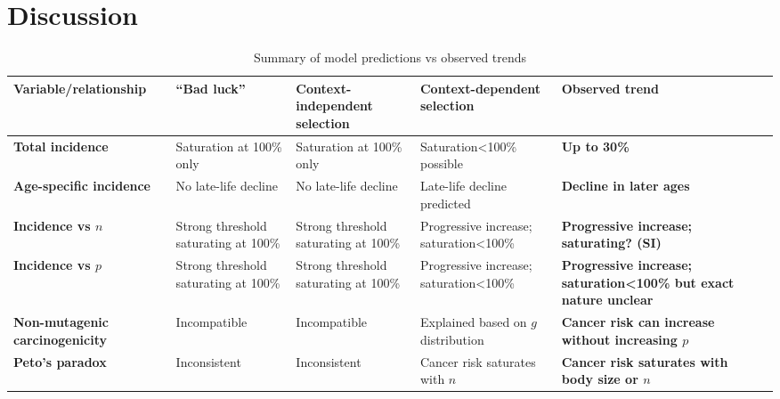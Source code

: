 \documentclass[9pt,twocolumn,twoside]{pnas-new}
\begin{document}
\section*{Discussion}
%
\begin{table}[tbhp]
\centering
\caption{Summary of model predictions vs observed trends}
\begin{tabular}{lp{2.5cm}p{3.5cm}p{3.5cm}p{3.5cm}p{4.5cm}}
\textbf{Variable/relationship} & ``Bad luck'' & Context-independent selection & Context-dependent selection & \textbf{Observed trend}\\
\midrule
\textbf{Total incidence} & Saturation at 100\% only & Saturation at 100\% only & Saturation<100\% possible & \textbf{Up to 30\%}\\
\textbf{Age-specific incidence} & No late-life decline & No late-life decline & Late-life decline predicted & \textbf{Decline in later ages} \\
\textbf{Incidence vs $n$} & Strong threshold saturating at 100\% & Strong threshold saturating at 100\% & Progressive increase; saturation<100\% & \textbf{Progressive increase; saturating? (SI)}\\
\textbf{Incidence vs $p$} & Strong threshold saturating at 100\% & Strong threshold saturating at 100\% & Progressive increase; saturation<100\% & \textbf{Progressive increase; saturation<100\% but exact nature unclear}\\
\textbf{Non-mutagenic carcinogenicity} & Incompatible & Incompatible & Explained based on $g$ distribution & \textbf{Cancer risk can increase without increasing $p$}\\
\textbf{Peto's paradox} & Inconsistent & Inconsistent & Cancer risk saturates with $n$ & \textbf{Cancer risk saturates with body size or $n$}\\
\bottomrule
\end{tabular}
\end{table}
\end{document}
